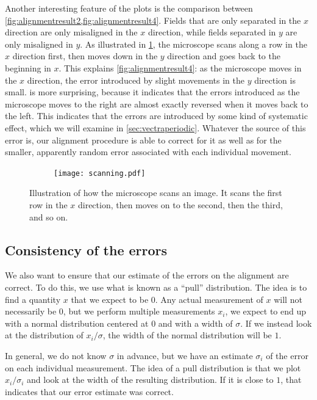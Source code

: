 \documentclass{article}
\begin{document}
Another interesting feature of the plots is the comparison between \cref{fig:alignmentresult2,fig:alignmentresult4}.  Fields that are only separated in the $x$ direction are only misaligned in the $x$ direction, while fields separated in $y$ are only misaligned in $y$.  As illustrated in \cref{fig:scanning}, the microscope scans along a row in the $x$ direction first, then moves down in the $y$ direction and goes back to the beginning in $x$.  This explains \cref{fig:alignmentresult4}: as the microscope moves in the $x$ direction, the error introduced by slight movements in the $y$ direction is small.   is more surprising, because it indicates that the errors introduced as the microscope moves to the right are almost exactly reversed when it moves back to the left.  This indicates that the errors are introduced by some kind of systematic effect, which we will examine in \cref{sec:vectraperiodic}.  Whatever the source of this error is, our alignment procedure is able to correct for it as well as for the smaller, apparently random error associated with each individual movement.

\begin{figure}[ht]
	\centering
	\begin{subfigure}{0.45\linewidth}
		\texttt{[image: scanning.pdf]}
	\end{subfigure}
	\caption{Illustration of how the microscope scans an image.  It scans the first row in the $x$ direction, then moves on to the second, then the third, and so on.}
	\label{fig:scanning}
\end{figure}

\subsection{Consistency of the errors}
\label{sec:pulls}

We also want to ensure that our estimate of the errors on the alignment are correct.  To do this, we use what is known as a ``pull'' distribution.  The idea is to find a quantity $x$ that we expect to be $0$.  Any actual measurement of $x$ will not necessarily be $0$, but we perform multiple measurements $x_i$, we expect to end up with a normal distribution centered at $0$ and with a width of $\sigma$.  If we instead look at the distribution of $x_i/\sigma$, the width of the normal distribution will be $1$.

In general, we do not know $\sigma$ in advance, but we have an estimate $\sigma_i$ of the error on each individual measurement.  The idea of a pull distribution is that we plot $x_i/\sigma_i$ and look at the width of the resulting distribution.  If it is close to $1$, that indicates that our error estimate was correct.
\end{document}
